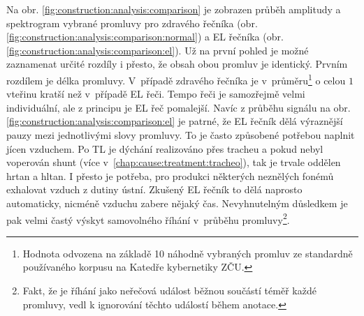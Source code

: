 Na obr. \ref{fig:construction:analysis:comparison} je zobrazen průběh amplitudy a spektrogram vybrané promluvy pro zdravého řečníka (obr. \ref{fig:construction:analysis:comparison:normal}) a EL řečníka (obr. \ref{fig:construction:analysis:comparison:el}).
Už na první pohled je možné zaznamenat určité rozdíly i přesto, že obsah obou promluv je identický.
Prvním rozdílem je délka promluvy.
V~případě zdravého řečníka je v~průměru\footnote{Hodnota odvozena na základě 10 náhodně vybraných promluv ze standardně používaného korpusu na Katedře kybernetiky ZČU.} o celou $1$ vteřinu kratší než v~případě EL řeči.
Tempo řeči je samozřejmě velmi individuální, ale z principu je EL řeč pomalejší.
Navíc z průběhu signálu na obr. \ref{fig:construction:analysis:comparison:el} je patrné, že EL řečník dělá výraznější pauzy mezi jednotlivými slovy promluvy.
To je často způsobené potřebou naplnit jícen vzduchem.
Po TL je dýchání realizováno přes tracheu a pokud nebyl voperován shunt (více v~\ref{chap:cause:treatment:tracheo}), tak je trvale oddělen hrtan a hltan.
I přesto je potřeba, pro produkci některých neznělých fonémů exhalovat vzduch z dutiny ústní.
Zkušený EL řečník to dělá naprosto automaticky, nicméně  vzduchu zabere nějaký čas.
Nevyhnutelným důsledkem je pak velmi častý výskyt samovolného říhání v~průběhu promluvy\footnote{Fakt, že je říhání jako neřečová událost běžnou součástí téměř každé promluvy, vedl k ignorování těchto událostí během anotace.}.


